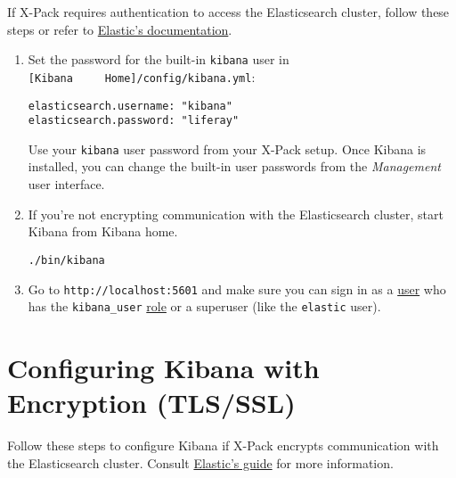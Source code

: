 If X-Pack requires authentication to access the Elasticsearch cluster,
follow these steps or refer to
\href{https://www.elastic.co/guide/en/kibana/7.x/monitoring-xpack-kibana.html}{Elastic's
documentation}.

\begin{enumerate}
\def\labelenumi{\arabic{enumi}.}
\item
  Set the password for the built-in \texttt{kibana} user in
  \texttt{{[}Kibana\ \ \ \ \ Home{]}/config/kibana.yml}:

\begin{verbatim}
elasticsearch.username: "kibana"
elasticsearch.password: "liferay"
\end{verbatim}

  Use your \texttt{kibana} user password from your X-Pack setup. Once
  Kibana is installed, you can change the built-in user passwords from
  the \emph{Management} user interface.
\item
  If you're not encrypting communication with the Elasticsearch cluster,
  start Kibana from Kibana home.

\begin{verbatim}
./bin/kibana
\end{verbatim}
\item
  Go to \texttt{http://localhost:5601} and make sure you can sign in as
  a
  \href{https://www.elastic.co/guide/en/elasticsearch/reference/current/realms.html}{user}
  who has the \texttt{kibana\_user}
  \href{https://www.elastic.co/guide/en/elasticsearch/reference/current/built-in-roles.html}{role}
  or a superuser (like the \texttt{elastic} user).
\end{enumerate}

\section{Configuring Kibana with Encryption
(TLS/SSL)}\label{configuring-kibana-with-encryption-tlsssl}

Follow these steps to configure Kibana if X-Pack encrypts communication
with the Elasticsearch cluster. Consult
\href{https://www.elastic.co/guide/en/kibana/7.x/using-kibana-with-security.html\#using-kibana-with-security}{Elastic's
guide} for more information.

